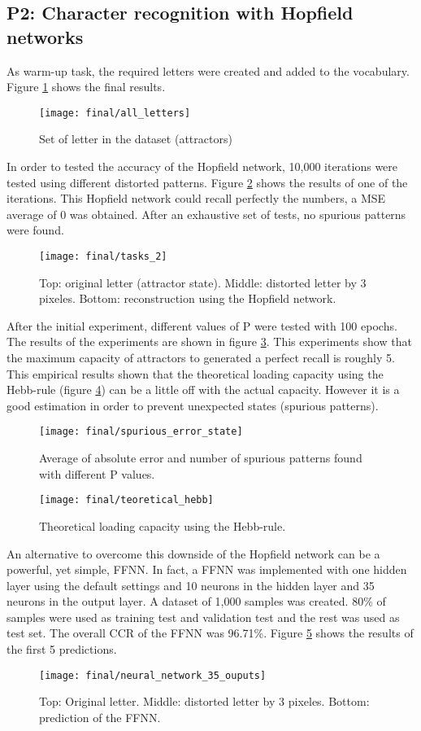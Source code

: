 \subsection{P2: Character recognition with Hopfield networks}
As warm-up task, the required letters were created and added to the vocabulary. Figure \ref{all_letter} shows the final results.

\begin{figure}[!htbp]
\caption{Set of letter in the dataset (attractors)}
\label{all_letter}
\medbreak
\texttt{[image: final/all\_letters]}
\centering
\end{figure}

In order to tested the accuracy of the Hopfield network, 10,000 iterations were tested using different distorted patterns. Figure \ref{final_3_1} shows the results of one of the iterations. This Hopfield network could recall perfectly the numbers, a MSE average of 0 was obtained. After an exhaustive set of tests, no spurious patterns were found. 

\begin{figure}[!htbp]
\caption{Top: original letter (attractor state). Middle: distorted letter by 3 pixeles. Bottom: reconstruction using the Hopfield network.}
\label{final_3_1}
\medbreak
\texttt{[image: final/tasks\_2]}
\centering
\end{figure}

After the initial experiment, different values of P were tested with 100 epochs. The results of the experiments are shown in figure \ref{spurious_error_state}. This experiments show that the maximum capacity of attractors to generated a perfect recall is roughly 5. This empirical results shown that the theoretical loading capacity using the Hebb-rule (figure \ref{teoretical_hebb}) can be a little off with the actual capacity. However it is a good estimation in order to prevent unexpected states (spurious patterns).


\begin{figure}[!htbp]
\caption{Average of absolute error and number of spurious patterns found with different P values.}
\label{spurious_error_state}
\medbreak
\texttt{[image: final/spurious\_error\_state]}
\centering
\end{figure}

\begin{figure}[!htbp]
\caption{Theoretical loading capacity using the Hebb-rule.}
\label{teoretical_hebb}
\medbreak
\texttt{[image: final/teoretical\_hebb]}
\centering
\end{figure}
\bigbreak
An alternative to overcome this downside of the Hopfield network can be a powerful, yet simple, FFNN. In fact, a FFNN was implemented with one hidden layer  using the default settings and 10 neurons in the hidden layer and 35 neurons in the output layer. A dataset of 1,000 samples was created. 80\% of samples were used as training test and validation test and the rest was used as test set. The overall CCR of the FFNN was 96.71\%. Figure \ref{neural_network_35_ouputs} shows the results of the first 5 predictions.

\begin{figure}[!htbp]
\caption{Top: Original letter. Middle: distorted letter by 3 pixeles. Bottom: prediction of the FFNN.}
\label{neural_network_35_ouputs}
\medbreak
\texttt{[image: final/neural\_network\_35\_ouputs]}
\centering
\end{figure}
